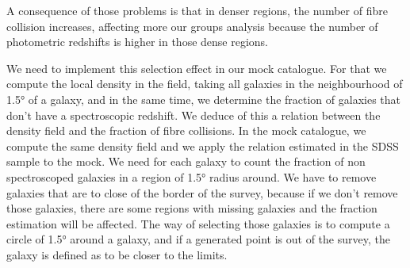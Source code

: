A consequence of those problems is that in denser regions, the number of fibre
collision increases, affecting more our groups analysis because the number of
photometric redshifts is higher in those dense regions.

We need to implement this selection effect in our mock catalogue. For that we
compute the local density in the field, taking all galaxies in the
neighbourhood of 1.5° of a galaxy, and in the same time, we determine the
fraction of galaxies that don't have a spectroscopic redshift. We deduce of
this a relation between the density field and the fraction of fibre collisions.
In the mock catalogue, we compute the same density field and we apply the
relation estimated in the SDSS sample to the mock. We need for
each galaxy to count the fraction of non spectroscoped galaxies in a region of
1.5° radius around. We have to remove galaxies that are to close of the
border of the survey, because if we don't remove those galaxies, there are some
regions with missing galaxies and the fraction estimation will be affected. The
way of selecting those galaxies is to compute a circle of 1.5° around a
galaxy, and if a generated point is out of the survey, the galaxy is defined as
to be closer to the limits.

